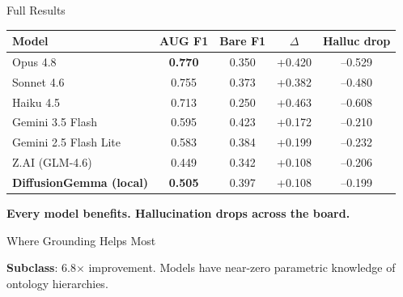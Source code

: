 \documentclass[aspectratio=169,11pt]{beamer}
\begin{document}
\begin{frame}{Full Results}
\centering
\small
\begin{tabular}{lcccc}
\toprule
Model & AUG F1 & Bare F1 & $\Delta$ & Halluc drop \\
\midrule
Opus 4.8 & \textbf{0.770} & 0.350 & \textcolor{burnt}{+0.420} & \textcolor{teal0}{--0.529} \\
Sonnet 4.6 & 0.755 & 0.373 & \textcolor{burnt}{+0.382} & \textcolor{teal0}{--0.480} \\
Haiku 4.5 & 0.713 & 0.250 & \textcolor{burnt}{+0.463} & \textcolor{teal0}{--0.608} \\
Gemini 3.5 Flash & 0.595 & 0.423 & \textcolor{burnt}{+0.172} & \textcolor{teal0}{--0.210} \\
Gemini 2.5 Flash Lite & 0.583 & 0.384 & \textcolor{burnt}{+0.199} & \textcolor{teal0}{--0.232} \\
Z.AI (GLM-4.6) & 0.449 & 0.342 & \textcolor{burnt}{+0.108} & \textcolor{teal0}{--0.206} \\
\midrule
\textbf{DiffusionGemma (local)} & \textbf{0.505} & 0.397 & \textcolor{burnt}{+0.108} & \textcolor{teal0}{--0.199} \\
\bottomrule
\end{tabular}

\vspace{4mm}
\textbf{Every model benefits. Hallucination drops across the board.}
\end{frame}

\begin{frame}{Where Grounding Helps Most}
\centering
{}

\vspace{-2mm}
{\small \textbf{Subclass}: 6.8$\times$ improvement. Models have near-zero parametric knowledge of ontology hierarchies.}
\end{frame}
\end{document}
